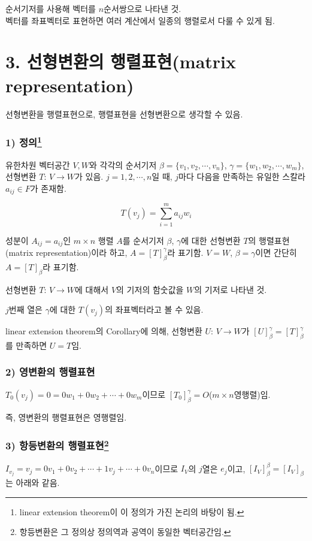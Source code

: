 순서기저를 사용해 벡터를 $n$순서쌍으로 나타낸 것.\\
벡터를 좌표벡터로 표현하면 여러 계산에서 일종의 행렬로서 다룰 수 있게 됨.\\

\newpage


\section*{3. 선형변환의 행렬표현(matrix representation)}

선형변환을 행렬표현으로, 행렬표현을 선형변환으로 생각할 수 있음.

\subsubsection*{1) 정의\footnote{linear extension theorem이 이 정의가 가진 논리의 바탕이 됨.}\\}
\begin{DEF}
유한차원 벡터공간 $V,W$와 각각의 순서기저 $\beta = \{v_1,v_2, \cdots ,v_n\}$, $\gamma = \{w_1,w_2, \cdots ,w_m\}$, 선형변환 $T:\,V \rightarrow W$가 있음. $j=1,2, \cdots ,n$일 때, $j$마다 다음을 만족하는 유일한 스칼라 $a_{ij} \in F$가 존재함.

\[
T(v_{j})=\sum_{i=1}^{m}{a_{ij}w_i}
\]

성분이 $A_{ij}=a_{ij}$인 $m \times n$ 행렬 $A$를 순서기저 $\beta$, $\gamma$에 대한 선형변환 $T$의 행렬표현(matrix representation)이라 하고, $A=[T]_{\beta}^{\gamma}$라 표기함. $V=W$, $\beta=\gamma$이면 간단히 $A=[T]_{\beta}$라 표기함.
\end{DEF}

선형변환 $T:\,V \rightarrow W$에 대해서 $V$의 기저의 함숫값을 $W$의 기저로 나타낸 것.

$j$번째 열은 $\gamma$에 대한 $T(v_j)$의 좌표벡터라고 볼 수 있음.

linear extension theorem의 Corollary에 의해, 선형변환 $U:\,V \rightarrow W$가 $[U]_{\beta}^{\gamma}=[T]_{\beta}^{\gamma}$를 만족하면 $U=T$임.


\subsubsection*{2) 영변환의 행렬표현}
$T_{0}(v_j)=0=0w_1+0w_2+ \cdots +0w_m$이므로 $[T_{0}]_{\beta}^{\gamma}=O$($m \times n$영행렬)임.

즉, 영변환의 행렬표현은 영행렬임.

\subsubsection*{3) 항등변환의 행렬표현\footnote{항등변환은 그 정의상 정의역과 공역이 동일한 벡터공간임.}}
$I_{v_j}=v_j=0v_1+0v_2+ \cdots +1v_j+ \cdots +0v_n$이므로 $I_V$의 $j$열은 $e_j$이고, $[I_{V}]_{\beta}^{\beta}=[I_{V}]_{\beta}$는 아래와 같음.

